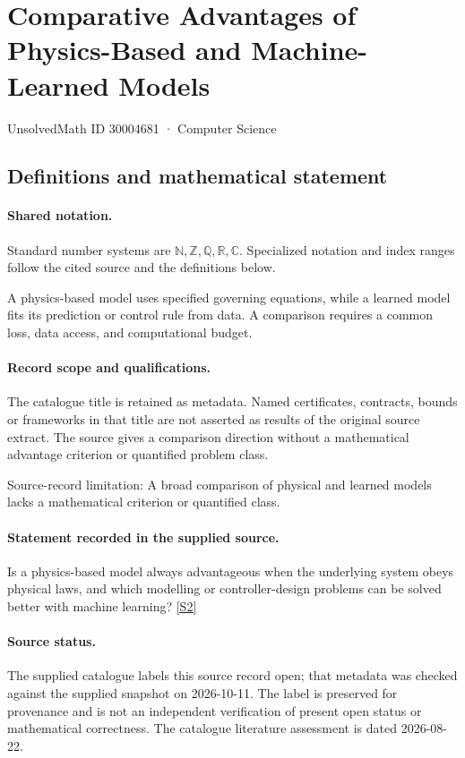 \documentclass[11pt]{article}
\newcommand{\sref}[2]{\hyperlink{source:#1:#2}{[S#2]}}
\begin{document}
\setcounter{section}{30004680}
\section{Comparative Advantages of Physics-Based and Machine-Learned Models}\label{30004681}
{\small\sffamily UnsolvedMath ID 30004681 · Computer Science}
\subsection{Definitions and mathematical statement}

\paragraph{Shared notation.}Standard number systems are $\mathbb N,\mathbb Z,\mathbb Q,\mathbb R,\mathbb C$. Specialized notation and index ranges follow the cited source and the definitions below.


A physics-based model uses specified governing equations, while a learned model fits its prediction or control rule from data. A comparison requires a common loss, data access, and computational budget.
\paragraph{Record scope and qualifications.}
The catalogue title is retained as metadata. Named certificates, contracts, bounds or frameworks in that title are not asserted as results of the original source extract.
The source gives a comparison direction without a mathematical advantage criterion or quantified problem class.

Source-record limitation: A broad comparison of physical and learned models lacks a mathematical criterion or quantified class.
\paragraph{Statement recorded in the supplied source.}
Is a physics-based model always advantageous when the underlying system obeys physical laws, and which modelling or controller-design problems can be solved better with machine learning? \sref{30004681}{2}
\paragraph{Source status.}
The supplied catalogue labels this source record open; that metadata was checked against the supplied snapshot on 2026-10-11. The label is preserved for provenance and is not an independent verification of present open status or mathematical correctness. The catalogue literature assessment is dated 2026-08-22.
\end{document}
